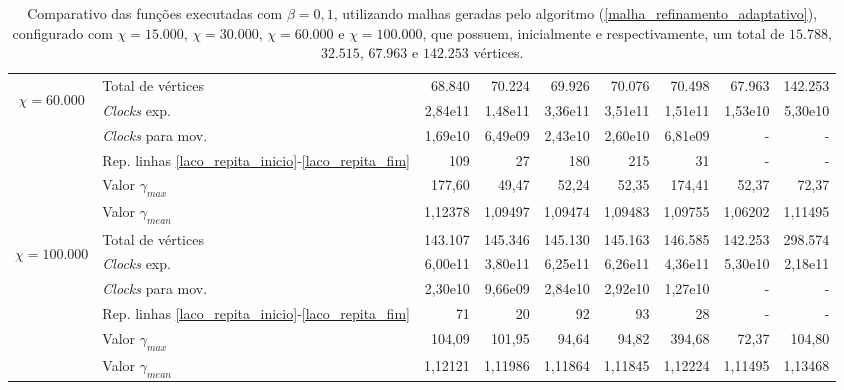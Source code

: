 \begin{table}
\begin{center}
\begin{tabular}{|c|l|r|r|r|r|r|r|r|}
\hline %
\multirow{5}{*}{\begin{sideways}$\chi = 60.000$\end{sideways} } 
& Total de vértices                                                     & 68.840& 70.224 & 69.926 & 70.076 & 70.498 & 67.963 & 142.253 \\
& {\it Clocks} exp.	                                             	& 2,84e11 & 1,48e11 & 3,36e11 & 3,51e11 & 1,51e11 & 1,53e10  & 5,30e10 \\
& {\it Clocks} para mov.                                      		& 1,69e10 & 6,49e09 & 2,43e10 & 2,60e10 & 6,81e09 & - & - \\
& Rep. linhas \ref{laco_repita_inicio}-\ref{laco_repita_fim} 		& 109 & 27 & 180 & 215 & 31 & - & - \\
& Valor $\gamma_{max}$							& 177,60 & 49,47 & 52,24 & 52,35 & 174,41 & 52,37 & 72,37 \\
& Valor $\gamma_{mean}$							& 1,12378 & 1,09497 & 1,09474 & 1,09483 & 1,09755 &  1,06202 & 1,11495 \\
\hline %
\multirow{5}{*}{\begin{sideways}$\chi = 100.000$\end{sideways} } 
& Total de vértices                                                     & 143.107 & 145.346 & 145.130 & 145.163 & 146.585 & 142.253 & 298.574 \\
& {\it Clocks} exp.	                                             	& 6,00e11 & 3,80e11 & 6,25e11 & 6,26e11 & 4,36e11 & 5,30e10 & 2,18e11 \\
& {\it Clocks} para mov.                                      		& 2,30e10 & 9,66e09 & 2,84e10 & 2,92e10 & 1,27e10 & - & - \\
& Rep. linhas \ref{laco_repita_inicio}-\ref{laco_repita_fim} 		& 71 & 20 & 92 & 93 & 28 & - & - \\
& Valor $\gamma_{max}$							& 104,09 & 101,95 & 94,64 & 94,82 & 394,68 & 72,37 & 104,80 \\
& Valor $\gamma_{mean}$							& 1,12121 & 1,11986 & 1,11864 & 1,11845 & 1,12224 & 1,11495 & 1,13468 \\
\hline %
\end{tabular}%
\end{center}
\caption{Comparativo das funções executadas com $\beta = 0,1$, utilizando malhas geradas pelo algoritmo (\ref{malha_refinamento_adaptativo}), configurado com $\chi = 15.000$, $\chi = 30.000$, $\chi = 60.000$ e $\chi = 100.000$, que possuem, inicialmente e respectivamente, um total de $15.788$, $32.515$, $67.963$ e $142.253$ vértices.} %
\label{tabelaComparativo_beta_1}
\end{table}

